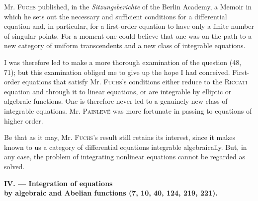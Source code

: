 \documentclass[11pt]{article}
\begin{document}
Mr. \textsc{Fuchs} published, in the \emph{Sitzungsberichte} of the Berlin Academy, a Memoir in which he sets out the necessary and sufficient conditions for a differential equation and, in particular, for a first-order equation to have only a finite number of singular points. For a moment one could believe that one was on the path to a new category of uniform transcendents and a new class of integrable equations.

I was therefore led to make a more thorough examination of the question (48, 71); but this examination obliged me to give up the hope I had conceived. First-order equations that satisfy Mr. \textsc{Fuchs}’s conditions either reduce to the \textsc{Riccati} equation and through it to linear equations, or are integrable by elliptic or algebraic functions. One is therefore never led to a genuinely new class of integrable equations. Mr. \textsc{Painlevé} was more fortunate in passing to equations of higher order.

Be that as it may, Mr. \textsc{Fuchs}’s result still retains its interest, since it makes known to us a category of differential equations integrable algebraically. But, in any case, the problem of integrating nonlinear equations cannot be regarded as solved.

\begin{center}
\textbf{IV. — Integration of equations\\
by algebraic and Abelian functions (7, 10, 40, 124, 219, 221).}
\end{center}
\end{document}
